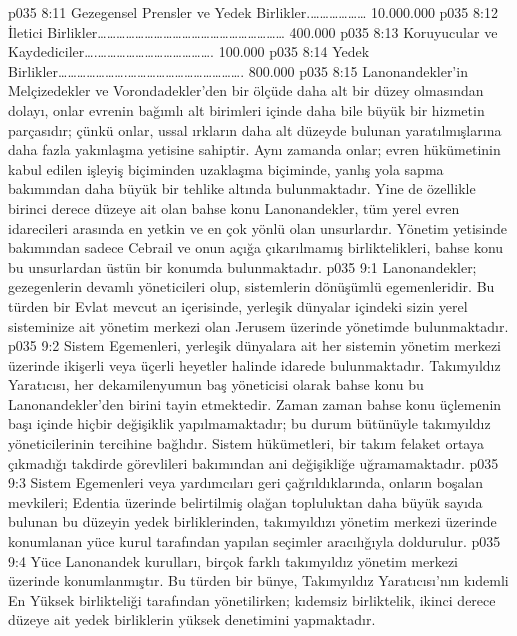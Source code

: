 \vs p035 8:11 Gezegensel Prensler ve Yedek Birlikler.……………… 10.000.000
\vs p035 8:12 İletici Birlikler…………………………………………………… 400.000
\vs p035 8:13 Koruyucular ve Kaydediciler….………………………………. 100.000
\vs p035 8:14 Yedek Birlikler………………….………………………………. 800.000
\vs p035 8:15 Lanonandekler’in Melçizedekler ve Vorondadekler’den bir ölçüde daha alt bir düzey olmasından dolayı, onlar evrenin bağımlı alt birimleri içinde daha bile büyük bir hizmetin parçasıdır; çünkü onlar, ussal ırkların daha alt düzeyde bulunan yaratılmışlarına daha fazla yakınlaşma yetisine sahiptir. Aynı zamanda onlar; evren hükümetinin kabul edilen işleyiş biçiminden uzaklaşma biçiminde, yanlış yola sapma bakımından daha büyük bir tehlike altında bulunmaktadır. Yine de özellikle birinci derece düzeye ait olan bahse konu Lanonandekler, tüm yerel evren idarecileri arasında en yetkin ve en çok yönlü olan unsurlardır. Yönetim yetisinde bakımından sadece Cebrail ve onun açığa çıkarılmamış birliktelikleri, bahse konu bu unsurlardan üstün bir konumda bulunmaktadır.
\vs p035 9:1 Lanonandekler; gezegenlerin devamlı yöneticileri olup, sistemlerin dönüşümlü egemenleridir. Bu türden bir Evlat mevcut an içerisinde, yerleşik dünyalar içindeki sizin yerel sisteminize ait yönetim merkezi olan Jerusem üzerinde yönetimde bulunmaktadır.
\vs p035 9:2 Sistem Egemenleri, yerleşik dünyalara ait her sistemin yönetim merkezi üzerinde ikişerli veya üçerli heyetler halinde idarede bulunmaktadır. Takımyıldız Yaratıcısı, her dekamilenyumun baş yöneticisi olarak bahse konu bu Lanonandekler’den birini tayin etmektedir. Zaman zaman bahse konu üçlemenin başı içinde hiçbir değişiklik yapılmamaktadır; bu durum bütünüyle takımyıldız yöneticilerinin tercihine bağlıdır. Sistem hükümetleri, bir takım felaket ortaya çıkmadığı takdirde görevlileri bakımından ani değişikliğe uğramamaktadır.
\vs p035 9:3 Sistem Egemenleri veya yardımcıları geri çağrıldıklarında, onların boşalan mevkileri; Edentia üzerinde belirtilmiş olağan topluluktan daha büyük sayıda bulunan bu düzeyin yedek birliklerinden, takımyıldızı yönetim merkezi üzerinde konumlanan yüce kurul tarafından yapılan seçimler aracılığıyla doldurulur.
\vs p035 9:4 Yüce Lanonandek kurulları, birçok farklı takımyıldız yönetim merkezi üzerinde konumlanmıştır. Bu türden bir bünye, Takımyıldız Yaratıcısı’nın kıdemli En Yüksek birlikteliği tarafından yönetilirken; kıdemsiz birliktelik, ikinci derece düzeye ait yedek birliklerin yüksek denetimini yapmaktadır.
